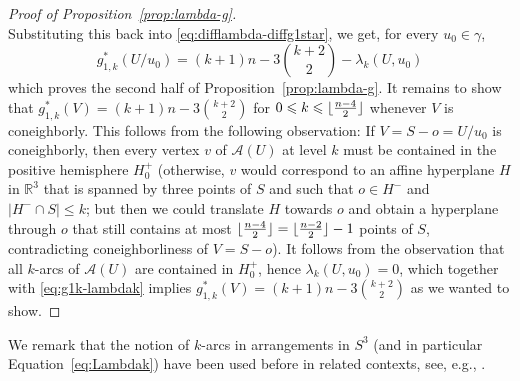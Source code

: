\documentclass[11pt]{article}
\renewcommand{\leq}{\leqslant}
\newcommand{\R}{\mathbb{R}}
\DeclarePairedDelimiter\floor{\lfloor}{\rfloor}
\begin{document}
\begin{proof}[Proof of Proposition~\ref{prop:lambda-g}]
\begin{equation}
\end{equation}
Substituting this back into \eqref{eq:difflambda-diffg1star}, we get, for every $u_0\in \gamma$,
\begin{equation}
\label{eq:g1k-lambdak}
g^*_{1,k}(U/u_0) = (k+1)n-3\binom{k+2}{2} - \lambda_k(U,u_0)
\end{equation}
which proves the second half of Proposition~\ref{prop:lambda-g}.
%
It remains to show that $g^*_{1,k}(V)= (k+1)n-3\binom{k+2}{2}$ for $0\leq k\leq \floor{\frac{n-4}{2}}$ whenever $V$ is coneighborly. This follows from the following observation: If  $V=S-o=U/u_0$ is coneighborly, then every vertex $v$ of $\mathcal{A}(U)$ at level $k$ must be contained in the positive hemisphere $H_0^+$ (otherwise, $v$ would correspond to an affine hyperplane $H$ in $\R^3$ that is spanned by three points of $S$ and such that $o\in H^-$ and $|H^-\cap S|\leq k$; but then we could translate $H$ towards $o$ and obtain a hyperplane through $o$ that still contains at most $\floor{\frac{n-4}{2}}= \floor{\frac{n-2}{2}}-1$ points of $S$, contradicting coneighborliness of $V=S-o$). It follows from the observation that all $k$-arcs of $\mathcal{A}(U)$ are contained in $H_0^+$, hence $\lambda_k(U,u_0)=0$, which together with \eqref{eq:g1k-lambdak} implies 
$g^*_{1,k}(V)= (k+1)n-3\binom{k+2}{2}$ as we wanted to show.
\end{proof}
%
We remark that the notion of $k$-arcs in arrangements in $S^3$ (and in particular Equation~\eqref{eq:Lambdak}) have been used before in related contexts, see, e.g., \cite{Edelsbrunner:1989aa,Ramos:2009aa}. 
%
%
\appendix
\end{document}
